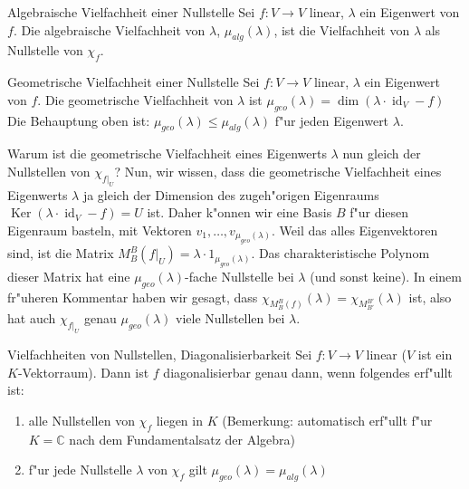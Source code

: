 \documentclass[oneside,fontsize=11pt,paper=a4,BCOR=0mm,DIV=12,automark,headsepline]{scrbook}
\DeclareMathOperator{\mKer}{Ker}
\DeclareMathOperator{\mId}{id}
\theoremstyle{remark}
\theoremstyle{definition}
\theoremstyle{definition}
\theoremstyle{remark}
\begin{document}
\begin{definition}{Algebraische Vielfachheit einer Nullstelle}{}
  Sei \(f: V\to V\) linear, $\lambda$ ein Eigenwert von $f$. Die algebraische Vielfachheit von \(\lambda\), \(\mu_{alg}(\lambda)\), ist die Vielfachheit von \(\lambda\) als Nullstelle von \(\chi_f\).
\end{definition}

\begin{definition}{Geometrische Vielfachheit einer Nullstelle}{}
  Sei \(f:V \to V\) linear, $\lambda$ ein Eigenwert von $f$. Die geometrische Vielfachheit von \(\lambda\) ist \(\mu_{geo}(\lambda) = \dim(\lambda\cdot\mId_V - f)\)
  Die Behauptung oben ist: \(\mu_{geo}(\lambda) \leq \mu_{alg}(\lambda)\) f"ur jeden Eigenwert \(\lambda\).
\end{definition}

\begin{comm}
  Warum ist die geometrische Vielfachheit eines Eigenwerts \(\lambda\) nun gleich der Nullstellen von \(\chi_{f|_U}\)? Nun, wir wissen, dass die geometrische Vielfachheit eines Eigenwerts \(\lambda\) ja gleich der Dimension des zugeh"origen Eigenraums \(\mKer (\lambda\cdot\mId_V - f) = U\) ist. Daher k"onnen wir eine Basis \(B\) f"ur diesen Eigenraum basteln, mit Vektoren \(v_1,\dots , v_{\mu_{geo}(\lambda)}\). Weil das alles Eigenvektoren sind, ist die Matrix \(M_B^B(f|_U) = \lambda\cdot 1_{\mu_{geo}(\lambda)}\). Das charakteristische Polynom dieser Matrix hat eine \(\mu_{geo}(\lambda)\)-fache Nullstelle bei \(\lambda\) (und sonst keine). In einem fr"uheren Kommentar haben wir gesagt, dass \(\chi_{M_B^B(f)}(\lambda) = \chi_{M_{B'}^{B'}}(\lambda)\) ist, also hat auch \(\chi_{f|_U}\) genau \(\mu_{geo}(\lambda)\) viele Nullstellen bei \(\lambda\).
\end{comm}

\begin{satz}{Vielfachheiten von Nullstellen, Diagonalisierbarkeit}{}
  Sei \(f: V\to V\) linear (\(V\) ist ein \(K\)-Vektorraum). Dann ist \(f\) diagonalisierbar genau dann, wenn folgendes erf"ullt ist:
  \begin{enumerate}
  \item alle Nullstellen von \(\chi_f\) liegen in \(K\) (Bemerkung: automatisch erf"ullt f"ur \(K = \mathbb{C}\) nach dem Fundamentalsatz der Algebra)
  \item f"ur jede Nullstelle \(\lambda\) von \(\chi_f\) gilt \(\mu_{geo}(\lambda) = \mu_{alg}(\lambda)\)
  \end{enumerate}
\end{satz}
\end{document}
